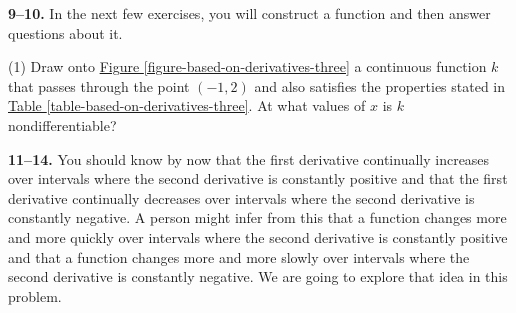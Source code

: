 \documentclass[10pt,oneside,]{book}
\theoremstyle{plain}
\theoremstyle{definition}
\numberwithin{equation}{section}
\newcommand{\hrulemedium}{\noalign{\hrule height 0.07em}}
\newcommand{\hrulethick} {\noalign{\hrule height 0.11em}}
\newcounter{figstack}
\newcounter{figindex}
\newlength\fight
\newcommand\pushValignCaptionBottom[5][b]{%
\stepcounter{figstack}%
\expandafter\def\csname %
figalign\romannumeral\value{figstack}\endcsname{#1}%
\expandafter\def\csname %
figtype\romannumeral\value{figstack}\endcsname{#2}%
\expandafter\def\csname %
figwd\romannumeral\value{figstack}\endcsname{#3}%
\expandafter\def\csname %
figcontent\romannumeral\value{figstack}\endcsname{#4}%
\expandafter\def\csname %
figcap\romannumeral\value{figstack}\endcsname{#5}%
\setbox0=\hbox{%
\begin{#2}{#3}#4\end{#2}}%
\ifdim\dimexpr\ht0+\dp0\relax>\fight\global\setlength{\fight}{%
\dimexpr\ht0+\dp0\relax}\fi%
}
\newcommand\popValignCaptionBottom{%
\setcounter{figindex}{0}%
\hfill%
\whiledo{\value{figindex}<\value{figstack}}{%
\stepcounter{figindex}%
\def\tmp{\csname figwd\romannumeral\value{figindex}\endcsname}%
\begin{\csname figtype\romannumeral\value{figindex}\endcsname}[t]{\tmp}%
\centering%
\stackinset{c}{}%
{\csname figalign\romannumeral\value{figindex}\endcsname}{}%
{\csname figcontent\romannumeral\value{figindex}\endcsname}%
{\rule{0pt}{\fight}}\par%
\csname figcap\romannumeral\value{figindex}\endcsname%
\end{\csname figtype\romannumeral\value{figindex}\endcsname}%
\hfill%
}%
\setcounter{figstack}{0}%
\setlength{\fight}{0pt}%
\hfill%
}
\newcommand{\fe}[2]{#1\mathopen{}\left(#2\right)\mathclose{}}
\newcommand{\ointerval}[2]{\left(#1,#2\right)}
\newcommand{\point}[2]{\left(#1,#2\right)}
\newcommand{\fd}[1]{#1'}
\newcommand{\sd}[1]{#1''}
\begin{document}
\par\smallskip\noindent
\textbf{9--10. }\hypertarget{exercisegroup-59}{\null}In the next few exercises, you will construct a function and then answer questions about it.%
\par
\begin{exercisegroup}(1)
\exercise[9.]\hypertarget{exercise-based-on-derivatives-three}{\null}Draw onto \hyperref[figure-based-on-derivatives-three]{Figure \ref{figure-based-on-derivatives-three}} a continuous function \(k\) that passes through the point \(\point{-1}{2}\) and also satisfies the properties stated in \hyperref[table-based-on-derivatives-three]{Table \ref{table-based-on-derivatives-three}}.%
\exercise[10.]\hypertarget{exercise-287}{\null}At what values of \(x\) is \(k\) nondifferentiable?%
\end{exercisegroup}
\par\smallskip\noindent
\textbf{11--14. }\hypertarget{exercisegroup-60}{\null}You should know by now that the first derivative  continually increases over intervals where the second derivative is constantly positive and that the first derivative continually decreases over intervals where the second derivative is constantly negative.  A person might infer from this that a function changes more and more quickly over intervals where the second derivative is constantly positive and that a function changes more and more slowly over intervals where the second derivative is constantly negative.   We are going to explore that idea in this problem.%
\end{document}
